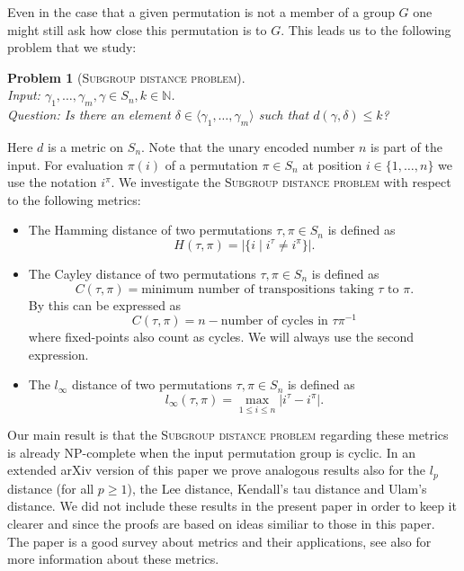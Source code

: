 \documentclass{article}
\newtheorem{problem}{Problem}
\begin{document}
Even in the case that a given permutation is not a member of a group $G$ one might still ask how close this permutation is to $G$. This leads us to the following problem that we study:
\begin{problem}[\textsc{Subgroup distance problem}]\label{problemSubgroupDistance}~\\
Input: $\gamma_1,\dots,\gamma_m,\gamma \in S_n, k \in \mathbb{N}$.\\
Question: Is there an element $\delta \in \langle \gamma_1,\dots,\gamma_m \rangle$ such that $d(\gamma,\delta) \leq k$?
\end{problem}
Here $d$ is a metric on $S_n$. Note that the unary encoded number $n$ is part of the input. For evaluation $\pi(i)$ of a permutation $\pi \in S_n$ at position $i \in \{1,\dots,n\}$ we use the notation $i^\pi$. We investigate the \textsc{Subgroup distance problem} with respect to the following metrics:
\begin{itemize}
\item The Hamming distance of two permutations $\tau, \pi \in S_n$ is defined as
\begin{displaymath}
H(\tau, \pi) = |\{i \mid i^\tau \neq i^\pi\}|.
\end{displaymath}
\item The Cayley distance of two permutations $\tau, \pi \in S_n$ is defined as
\begin{displaymath}
C(\tau,\pi) = \text{minimum number of transpositions taking } \tau \text{ to } \pi.
\end{displaymath}
By \cite{diaconis} this can be expressed as
\begin{displaymath}
C(\tau,\pi) = n - \text{number of cycles in } \tau\pi^{-1}
\end{displaymath}
where fixed-points also count as cycles. We will always use the second expression.
\item The $l_\infty$ distance of two permutations $\tau, \pi \in S_n$ is defined as
\begin{displaymath}
l_\infty(\tau,\pi) = \max_{1 \leq i \leq n} |i^\tau - i^\pi|.
\end{displaymath}
\end{itemize}
Our main result is that the \textsc{Subgroup distance problem} regarding these metrics is already {\sf NP}-complete when the input permutation group is cyclic. In an extended arXiv version \cite{rosowski} of this paper we prove analogous results also for the $l_p$ distance (for all $p \geq 1$), the Lee distance, Kendall's tau distance and Ulam's distance. We did not include these results in the present paper in order to keep it clearer and since the proofs are based on ideas similiar to those in this paper. The paper \cite{deza} is a good survey about metrics and their applications, see also \cite[Chapter~6]{diaconis} for more information about these metrics.
\end{document}
